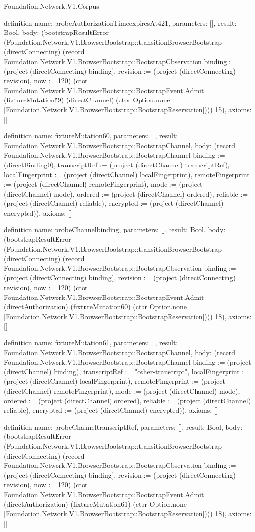 \begin{lexlean}{Foundation.Network.V1.Corpus}
\begin{semanticmodule}
definition{
  name: probeAuthorizationTimeexpiresAt421,
  parameters: [],
  result: Bool,
  body: (bootstrapResultError (Foundation.Network.V1.BrowserBootstrap::transitionBrowserBootstrap (directConnecting) (record Foundation.Network.V1.BrowserBootstrap::BootstrapObservation {binding := (project (directConnecting) binding), revision := (project (directConnecting) revision), now := 120}) (ctor Foundation.Network.V1.BrowserBootstrap::BootstrapEvent.Admit (fixtureMutation59) (directChannel) (ctor Option.none [Foundation.Network.V1.BrowserBootstrap::BootstrapReservation]))) 15),
  axioms: []
}

definition{
  name: fixtureMutation60,
  parameters: [],
  result: Foundation.Network.V1.BrowserBootstrap::BootstrapChannel,
  body: (record Foundation.Network.V1.BrowserBootstrap::BootstrapChannel {binding := (directBinding0), transcriptRef := (project (directChannel) transcriptRef), localFingerprint := (project (directChannel) localFingerprint), remoteFingerprint := (project (directChannel) remoteFingerprint), mode := (project (directChannel) mode), ordered := (project (directChannel) ordered), reliable := (project (directChannel) reliable), encrypted := (project (directChannel) encrypted)}),
  axioms: []
}

definition{
  name: probeChannelbinding,
  parameters: [],
  result: Bool,
  body: (bootstrapResultError (Foundation.Network.V1.BrowserBootstrap::transitionBrowserBootstrap (directConnecting) (record Foundation.Network.V1.BrowserBootstrap::BootstrapObservation {binding := (project (directConnecting) binding), revision := (project (directConnecting) revision), now := 120}) (ctor Foundation.Network.V1.BrowserBootstrap::BootstrapEvent.Admit (directAuthorization) (fixtureMutation60) (ctor Option.none [Foundation.Network.V1.BrowserBootstrap::BootstrapReservation]))) 18),
  axioms: []
}

definition{
  name: fixtureMutation61,
  parameters: [],
  result: Foundation.Network.V1.BrowserBootstrap::BootstrapChannel,
  body: (record Foundation.Network.V1.BrowserBootstrap::BootstrapChannel {binding := (project (directChannel) binding), transcriptRef := "other-transcript", localFingerprint := (project (directChannel) localFingerprint), remoteFingerprint := (project (directChannel) remoteFingerprint), mode := (project (directChannel) mode), ordered := (project (directChannel) ordered), reliable := (project (directChannel) reliable), encrypted := (project (directChannel) encrypted)}),
  axioms: []
}

definition{
  name: probeChanneltranscriptRef,
  parameters: [],
  result: Bool,
  body: (bootstrapResultError (Foundation.Network.V1.BrowserBootstrap::transitionBrowserBootstrap (directConnecting) (record Foundation.Network.V1.BrowserBootstrap::BootstrapObservation {binding := (project (directConnecting) binding), revision := (project (directConnecting) revision), now := 120}) (ctor Foundation.Network.V1.BrowserBootstrap::BootstrapEvent.Admit (directAuthorization) (fixtureMutation61) (ctor Option.none [Foundation.Network.V1.BrowserBootstrap::BootstrapReservation]))) 18),
  axioms: []
}


\end{semanticmodule}
\end{lexlean}
